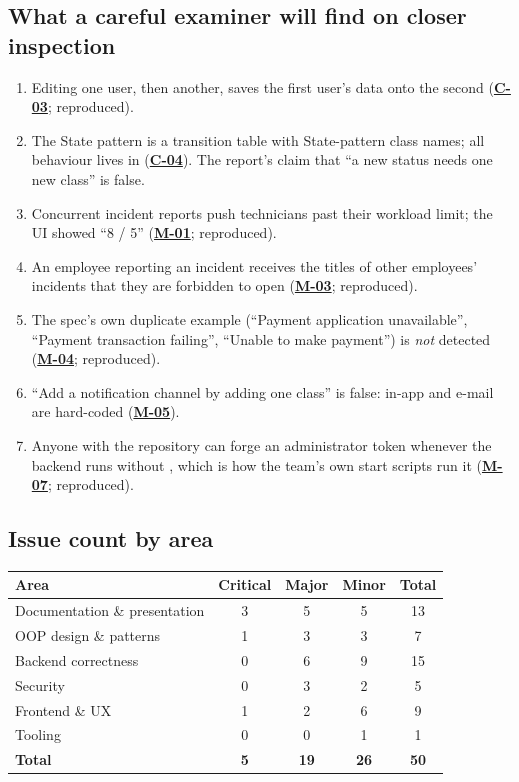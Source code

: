 \documentclass[11pt,a4paper]{article}
\newcommand{\code}[1]{{\ttfamily\small\detokenize{#1}}}
\newcommand{\iref}[1]{\hyperref[iss:#1]{\textbf{#1}}}
\begin{document}
\subsection{What a careful examiner will find on closer inspection}
\begin{enumerate}[leftmargin=1.6em]
\item Editing one user, then another, saves the first user's data onto the second (\iref{C-03}; reproduced).
\item The State pattern is a transition table with State-pattern class names; all behaviour lives in \code{Incident}
  (\iref{C-04}). The report's claim that ``a new status needs one new class'' is false.
\item Concurrent incident reports push technicians past their workload limit; the UI showed ``8 / 5''
  (\iref{M-01}; reproduced).
\item An employee reporting an incident receives the titles of other employees' incidents that they are forbidden
  to open (\iref{M-03}; reproduced).
\item The spec's own duplicate example (``Payment application unavailable'', ``Payment transaction failing'',
  ``Unable to make payment'') is \emph{not} detected (\iref{M-04}; reproduced).
\item ``Add a notification channel by adding one class'' is false: in-app and e-mail are hard-coded (\iref{M-05}).
\item Anyone with the repository can forge an administrator token whenever the backend runs without
  \code{JWT_SECRET}, which is how the team's own start scripts run it (\iref{M-07}; reproduced).
\end{enumerate}

\subsection{Issue count by area}
\begin{center}
\begin{tabular}{lccc c}
\toprule
\textbf{Area} & \textbf{Critical} & \textbf{Major} & \textbf{Minor} & \textbf{Total}\\
\midrule
Documentation \& presentation & 3 & 5 & 5 & 13\\
OOP design \& patterns        & 1 & 3 & 3 & 7\\
Backend correctness           & 0 & 6 & 9 & 15\\
Security                      & 0 & 3 & 2 & 5\\
Frontend \& UX                & 1 & 2 & 6 & 9\\
Tooling                       & 0 & 0 & 1 & 1\\
\midrule
\textbf{Total} & \textbf{5} & \textbf{19} & \textbf{26} & \textbf{50}\\
\bottomrule
\end{tabular}
\end{center}
\end{document}
